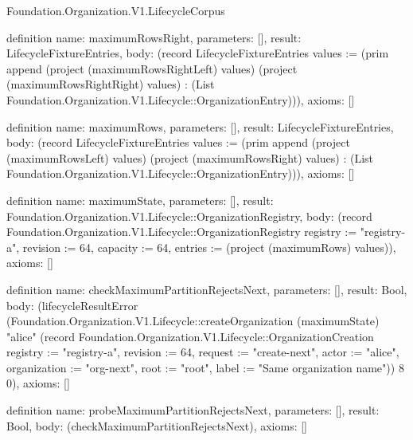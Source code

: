 \begin{lexlean}{Foundation.Organization.V1.LifecycleCorpus}
\begin{semanticmodule}
definition{
  name: maximumRowsRight,
  parameters: [],
  result: LifecycleFixtureEntries,
  body: (record LifecycleFixtureEntries {values := (prim append (project (maximumRowsRightLeft) values) (project (maximumRowsRightRight) values) : (List Foundation.Organization.V1.Lifecycle::OrganizationEntry))}),
  axioms: []
}

definition{
  name: maximumRows,
  parameters: [],
  result: LifecycleFixtureEntries,
  body: (record LifecycleFixtureEntries {values := (prim append (project (maximumRowsLeft) values) (project (maximumRowsRight) values) : (List Foundation.Organization.V1.Lifecycle::OrganizationEntry))}),
  axioms: []
}

definition{
  name: maximumState,
  parameters: [],
  result: Foundation.Organization.V1.Lifecycle::OrganizationRegistry,
  body: (record Foundation.Organization.V1.Lifecycle::OrganizationRegistry {registry := "registry-a", revision := 64, capacity := 64, entries := (project (maximumRows) values)}),
  axioms: []
}

definition{
  name: checkMaximumPartitionRejectsNext,
  parameters: [],
  result: Bool,
  body: (lifecycleResultError (Foundation.Organization.V1.Lifecycle::createOrganization (maximumState) "alice" (record Foundation.Organization.V1.Lifecycle::OrganizationCreation {registry := "registry-a", revision := 64, request := "create-next", actor := "alice", organization := "org-next", root := "root", label := "Same organization name"})) 8 0),
  axioms: []
}

definition{
  name: probeMaximumPartitionRejectsNext,
  parameters: [],
  result: Bool,
  body: (checkMaximumPartitionRejectsNext),
  axioms: []
}


\end{semanticmodule}
\end{lexlean}

